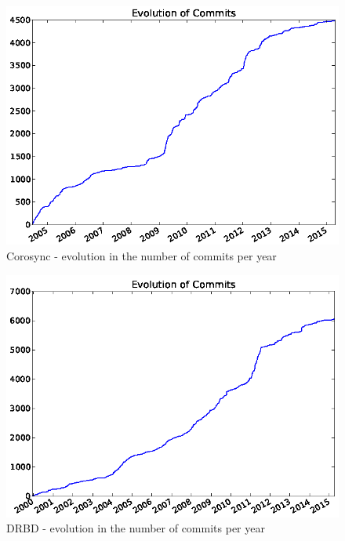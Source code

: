 \documentclass[a4paper, 12pt]{book}
\begin{document}
    \begin{figure}[H]
      \centering
      \includegraphics[scale=0.45]{fig8-4.png}
      \caption[Evolution in the number of commits for Corosync]{Corosync - evolution in the number of commits per year}
      \label{fig:fig8-4}
    \end{figure}
	  
    \begin{figure}[H]
      \centering
      \includegraphics[scale=0.45]{fig8-5.png}
      \caption[Evolution in the number of commits for DRBD]{DRBD - evolution in the number of commits per year}
      \label{fig:fig8-5}
    \end{figure}
    
\end{document}
